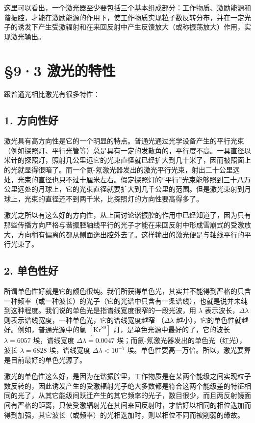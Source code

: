 这里可以看出，一个激光器至少要包括三个基本组成部分：工作物质、激励能源和谐振腔，才能在激励能源的作用下，使工作物质实现粒子数反转分布，并在一定光子的诱发下产生受激辐射和在来回反射中产生反馈放大（或称振荡放大）作用，实现激光输出。

\section{§9·3 激光的特性}

跟普通光相比激光有很多特性：

\subsection{1. 方向性好}

激光具有高方向性是它的一个明显的特点。普通光通过光学设备产生的平行光束（例如探照灯、平行光管等）总是具有一定的发散角的，平行度不高。一具直径以米计的探照灯，照射几公里远它的光束直径就已经扩大到几十米了，因而被照面上的光就显得很暗了。而一个氦-氖激光器发出的激光平行光束，射出二十公里远处，光束的直径也只不过十厘米左右。假定探照灯的``平行''光束能够照到三十八万公里远处的月球上，它的光束直径就要扩大到几千公里的范围。但是激光束射到月球上，光束的直径还不到两千米，比探照灯的方向性要高得多了。

激光之所以有这么好的方向性，从上面讨论谐振腔的作用中已经知道了，因为只有那些传播方向严格与谐振腔轴线平行的光子才能在来回反射中形成雪崩式的受激放大，方向稍有偏离的都从侧面逸出腔外去了。这样输出的激光便是与轴线平行的平行光束了。

\subsection{2. 单色性好}

所谓单色性好就是它的颜色很纯。我们所获得单色光，其实并不能得到严格的只含一种频率（或一种波长）的光子（它的光谱中只含有一条谱线），也就是说并未纯到这种程度。我们说的单色光是指谱线宽度很窄的一段光波，用
\(\lambda\) 表示波长，\(\Delta \lambda\)
则表示谱线宽度，一种单色光，它的谱线宽度越窄 （\(\Delta \lambda\)
越小），它的单色性就越好。例如，普通光源中的氪
\(\left[\mathrm{Kr}^{89}\right]\) 灯，是单色光源中最好的了，它的波长
\(\lambda = 6057\) 埃，谱线宽度 \(\Delta \lambda = 0.0047\)
埃；而氦-氖激光器发出的单色光（红光），波长 \(\lambda = 6828\)
埃，谱线宽度 \(\Delta \lambda < 10^{-7}\)
埃。单色性要高一万倍。所以，激光要算是目前最好的单色光源了。

激光的单色性这么好，是因为在谐振腔里，工作物质是在某两个能级之间实现粒子数反转的，因此诱发产生的受激辐射光子绝大多数都是符合这两个能级差的特征相同的光了，从其它能级间跃迁产生的其它频率的光子，数目很少，而且两反射镜面间有严格的距离，只使受激辐射光在其间来回反射时，才恰好以相同的相位迭加而得到加强，其它波长（或频率）的光相迭加时，则以相位不同而被削弱的缘故。


